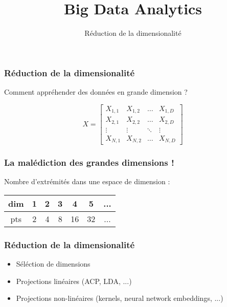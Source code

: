 \documentclass{formation}
\title{Big Data Analytics}
\subtitle{Réduction de la dimensionalité}
\begin{document}
\maketitle

\begin{frame}
  \frametitle{Réduction de la dimensionalité}
    \begin{center}
      Comment appréhender des données en grande dimension ?
    \end{center}
    \[
    X = \begin{bmatrix}
      X_{1,1} & X_{1,2} & \dots  & X_{1,D} \\
      X_{2,1} & X_{2,2} & \dots  & X_{2,D} \\
      \vdots & \vdots & \ddots & \vdots \\
      X_{N,1} & X_{N,2} & \dots  & X_{N,D}
    \end{bmatrix}
    \]
\end{frame}

\begin{frame}
  \frametitle{La malédiction des grandes dimensions !}
    \begin{center}
      Nombre d'extrémités dans une espace de dimension : \\
      $\;$ \\
      \begin{tabular}{|c|c|c|c|c|c|c|}
        \hline
        dim & 1 & 2 & 3 & 4 & 5 & ... \\
        \hline
        pts & 2 & 4 & 8 & 16 & 32 & ...\\
        \hline
      \end{tabular}
    \end{center}
\end{frame}

\begin{frame}
  \frametitle{Réduction de la dimensionalité}
    \begin{itemize}
    \item Séléction de dimensions
    \item Projections linéaires (ACP, LDA, ...)
    \item Projections non-linéaires (kernels, neural network embeddings, ...)
    \end{itemize}
\end{frame}
\end{document}
